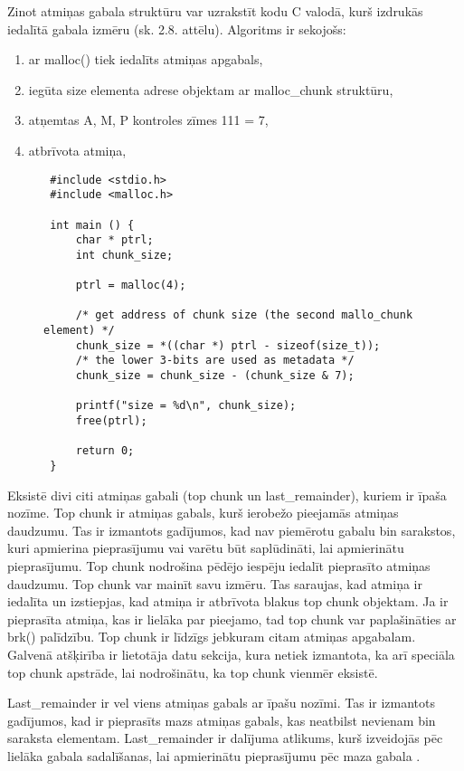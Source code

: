 Zinot atmiņas gabala struktūru var uzrakstīt kodu C valodā, kurš izdrukās iedalītā gabala izmēru (sk. 2.8. attēlu).
Algoritms ir sekojošs: 
\begin{enumerate}
\item ar malloc() tiek iedalīts atmiņas apgabals,
\item  iegūta size elementa adrese objektam ar malloc\_chunk struktūru,
\item  atņemtas A, M, P kontroles zīmes 111 = 7,
\item  atbrīvota atmiņa,
\end{enumerate}
\begin{figure}[h]
\begin{lstlisting}
 #include <stdio.h>
 #include <malloc.h>

 int main () {
     char * ptrl;
     int chunk_size;

     ptrl = malloc(4);
 
     /* get address of chunk size (the second mallo_chunk element) */
     chunk_size = *((char *) ptrl - sizeof(size_t));
     /* the lower 3-bits are used as metadata */
     chunk_size = chunk_size - (chunk_size & 7);
 
     printf("size = %d\n", chunk_size);
     free(ptrl);
 
     return 0;
 }
\end{lstlisting}
\caption{\textbf{\fontsize{11}{12}\selectfont {Izmēra noteikšana iedalītām gabalam}}}
\end{figure}

Eksistē divi citi atmiņas gabali (top chunk un last\_remainder), kuriem ir īpaša nozīme. 
Top chunk ir atmiņas gabals, kurš ierobežo pieejamās atmiņas daudzumu.
Tas ir izmantots gadījumos, kad nav piemērotu gabalu bin sarakstos, kuri apmierina pieprasījumu vai varētu būt saplūdināti, lai apmierinātu pieprasījumu.
Top chunk nodrošina pēdējo iespēju iedalīt pieprasīto atmiņas daudzumu.
Top chunk var mainīt savu izmēru. Tas saraujas, kad atmiņa ir iedalīta un izstiepjas, kad atmiņa ir atbrīvota blakus top chunk objektam. 
Ja ir pieprasīta atmiņa, kas ir lielāka par pieejamo, tad top chunk var paplašināties ar brk() palīdzību.
Top chunk ir līdzīgs jebkuram citam atmiņas apgabalam. 
Galvenā atšķirība ir lietotāja datu sekcija, kura netiek izmantota, ka arī speciāla top chunk apstrāde, lai nodrošinātu, ka top chunk vienmēr eksistē.

Last\_remainder ir vel viens atmiņas gabals ar īpašu nozīmi.
Tas ir izmantots gadījumos, kad ir pieprasīts mazs atmiņas gabals, kas neatbilst nevienam bin saraksta elementam. 
Last\_remainder ir dalījuma atlikums, kurš izveidojās pēc lielāka gabala sadalīšanas, lai apmierinātu pieprasījumu pēc maza gabala  \cite {BLACKHAT}.


